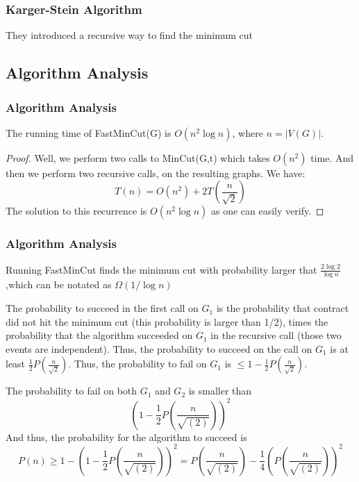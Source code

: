 \documentclass[compress,blue]{beamer}
\begin{document}
	\begin{frame}[c]
	\frametitle{Karger-Stein Algorithm}
	They introduced a recursive way to find the minimum cut
	\vspace{2em}
	
	\end{frame}

	\subsection{Algorithm Analysis}
	\begin{frame}[c]
	\frametitle{Algorithm Analysis}
	\begin{theorem}
			The running time of FastMinCut(G) is $ O(n^2 \log n) $, where $ n=|V(G)| $.
	\end{theorem}
	\begin{proof}
			Well, we perform two calls to MinCut(G,t) which takes $ O(n^2) $ time. And then we perform two recursive calls, on the resulting graphs. We have:\[ T(n)=O(n^2)+2T(\frac{n}{\sqrt{2}}) \]
			The solution to this recurrence is $ O(n^2 \log n) $ as one can easily verify.
	\end{proof}
	\end{frame}
	
	\begin{frame}[c]
	\frametitle{Algorithm Analysis}
	\begin{theorem}
		Running FastMinCut finds the minimum cut with probability larger that $ \frac{2\log 2}{\log n}$,which can be notated as $ \Omega(1/\log n) $
	\end{theorem}
	\small The probability to succeed in the first call on $ G_1 $ is the probability that contract did not hit the minimum cut (this probability is larger than 1/2), times the probability that the algorithm succeeded on $ G_1 $ in the recursive call (those two events are independent). Thus, the probability to succeed on the call on $ G_1 $ is at least $ \frac{1}{2}P(\frac{n}{\sqrt{2}}) $. Thus, the probability to fail on $ G_1 $ is $ \leq 1-\frac{1}{2}P(\frac{n}{\sqrt{2}}) $.
	
	The probability to fail on both $ G_1 $ and $ G_2 $ is smaller than \[ (1-\frac{1}{2}P(\frac{n}{\sqrt{(2)}}))^2 \]
	And thus, the probability for the algorithm to succeed is \[ P(n)\geq 1-(1-\frac{1}{2}P(\frac{n}{\sqrt{(2)}}))^2 = P(\frac{n}{\sqrt{(2)}})-\frac{1}{4}(P(\frac{n}{\sqrt{(2)}}))^2 \]
	\end{frame}
\end{document}
